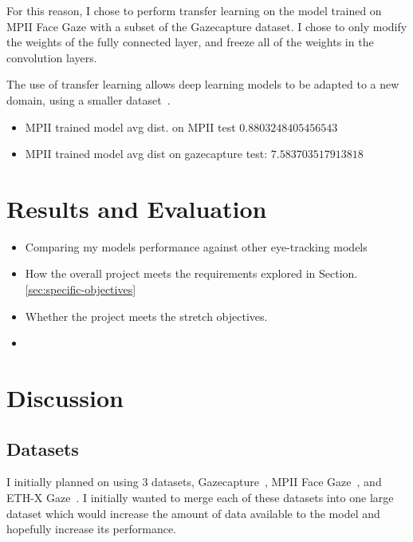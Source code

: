 \documentclass[twocolumn]{report}
\begin{document}
For this reason, I chose to perform transfer learning on the model trained on MPII Face Gaze with a subset of the Gazecapture dataset. I chose to only modify the weights of the fully connected layer, and freeze all of the weights in the convolution layers. 

The use of transfer learning allows deep learning models to be adapted to a new domain, using a smaller dataset~\cite{koehrsen2018transfer}. 

\begin{itemize}
    \item MPII trained model avg dist. on MPII test \(0.8803248405456543\)
    \item MPII trained model avg dist on gazecapture test: \(7.583703517913818\)
\end{itemize}


\chapter{Results and Evaluation}

\begin{itemize}
    \item Comparing my models performance against other eye-tracking models
    \item How the overall project meets the requirements explored in Section. \ref{sec:specific-objectives}
    \item Whether the project meets the stretch objectives.
    \item
\end{itemize}

\chapter{Discussion}

\section{Datasets}

I initially planned on using 3 datasets, Gazecapture~\cite{krafka2016eye}, MPII Face Gaze~\cite{zhang2019mpii}, and ETH-X Gaze~\cite{zhang2020ethxgaze}. I initially wanted to merge each of these datasets into one large dataset which would increase the amount of data available to the model and hopefully increase its performance.
\end{document}
